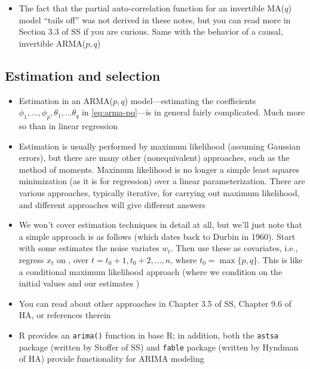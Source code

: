 \documentclass{article}
\begin{document}
\begin{itemize}
\item The fact that the partial auto-correlation function for an invertible
  MA($q$) model ``tails off'' was not derived in these notes, but you can read
  more in Section 3.3 of SS if you are curious. Same with the behavior of a
  causal, invertible ARMA($p,q$) 
\end{itemize}

\subsection{Estimation and selection}

\begin{itemize}
\item Estimation in an ARMA($p,q$) model---estimating the coefficients
  $\phi_1,\dots,\phi_p,\theta_1,\dots\theta_q$ in \eqref{eq:arma-pq}---is in 
  general fairly complicated. Much more so than in linear regression 

\item Estimation is usually performed by maximum likelihood (assuming Gaussian
  errors), but there are many other (nonequivalent) approaches, such as the
  method of moments. Maximum likelihood is no longer a simple least squares 
  minimization (as it is for regression) over a linear parameterization. There
  are various approaches, typically iterative, for carrying out maximum
  likelihood, and different approaches will give different answers     

\item We won't cover estimation techniques in detail at all, but we'll just note
  that a simple approach is as follows (which dates back to Durbin in
  1960). Start with some estimates  the noise variates
  $w_t$. Then use these as covariates, i.e., regress $x_t$ on
  , over $t =
  t_0+1,t_0+2,\dots,n$, where $t_0 = \max\{p,q\}$. This is like a conditional  
  maximum likelihood approach (where we condition on the initial values
   and our estimates
  )

\item You can read about other approaches in Chapter 3.5 of SS, Chapter 9.6 of
  HA, or references therein  

\item R provides an \verb|arima()| function in base R; in addition, both the
  \verb|astsa| package (written by Stoffer of SS) and \verb|fable| package
  (written by Hyndman of HA) provide functionality for ARIMA modeling


\end{itemize}
\end{document}
